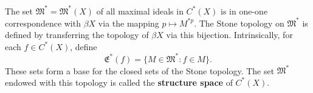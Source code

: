The set $\mathfrak{M}^* = \mathfrak{M}^*(X)$ of all maximal ideals in $C^*(X)$ is in one-one correspondence with $\beta X$ via the mapping $p \mapsto M^{*p}$. The Stone topology on $\mathfrak{M}^*$ is defined by transferring the topology of $\beta X$ via this bijection. Intrinsically, for each $f \in C^*(X)$, define
$$\mathfrak{E}^*(f) = \{M \in \mathfrak{M}^* : f \in M\}.$$
These sets form a base for the closed sets of the Stone topology. The set $\mathfrak{M}^*$ endowed with this topology is called the \textbf{structure space} of $C^*(X)$.
